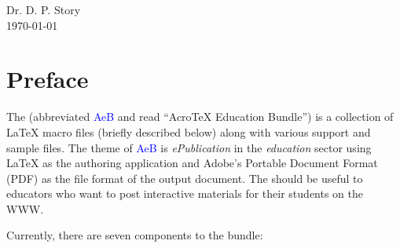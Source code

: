 \documentclass{article}
\def\AcroT{Acro\!\TeX}\def\cAcroT{\textcolor{blue}{\AcroT}}
\def\AEB{\textsf{AeB}}
\def\cAEB{\textcolor{blue}{\AEB}}
\def\AEB{\textsf{AeB}}
\begin{document}
\begin{flushright}
Dr. D. P. Story\\[3pt]
\today
\end{flushright}

\part{Preface}



The {\cAcroEB} (abbreviated {\cAEB} and read ``{\AcroT} Education
Bundle'') is a collection of {\LaTeX} macro files (briefly described
below) along with various support and sample files. The theme of {\cAEB}
is \textit{ePublication} in the \textit{education} sector using {\LaTeX}
as the authoring application and Adobe's Portable Document Format
(\textsf{PDF}) as the file format of the output document. The \cAcroB{}
should be useful to educators who want to post interactive materials for
their students on the \textsf{WWW}.

\newtopic Currently, there are seven components to the bundle:
\end{document}
